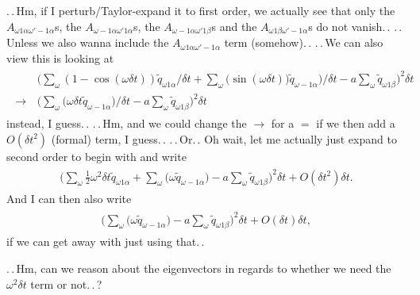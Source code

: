 \documentclass{report}
\begin{document}
.\,.\,Hm, if I perturb/Taylor-expand it to first order, we actually see that only the $A_{\omega 1\alpha\omega'-1\alpha}$s, the $A_{\omega- 1\alpha\omega' 1\alpha}$s, the $A_{\omega-1\alpha\omega' 1\beta}$s and the $A_{\omega 1\beta\omega'-1\alpha}$s do not vanish.\,. .\,.\,Unless we also wanna include the $A_{\omega 1\alpha\omega'-1\alpha}$ term (somehow).\,. .\,.\,We can also view this is looking at
\begin{align}
\begin{aligned}
	&\,\bigg( 
		\sum_{\omega} 
			(1 - \cos(\omega \delta t)) \tilde q_{\omega 1\alpha} 
			/ \delta t 
		+ 
		\sum_{\omega} \big(
			\sin(\omega \delta t)) \tilde q_{\omega-1\alpha}
		\big) / \delta t 
		- 
		a \sum_{\omega} 
			\tilde q_{\omega 1\beta}
	\bigg)^2 
	\delta t
	\\
	\to&\,\bigg(
		\sum_{\omega} \big(
			\omega \delta t \tilde q_{\omega-1\alpha}
		\big) / \delta t 
		- 
		a \sum_{\omega} 
			\tilde q_{\omega 1\beta}
	\bigg)^2 
	\delta t
\end{aligned}
\end{align}
instead, I guess.\,. .\,.\,Hm, and we could change the $\to$ for a $=$ if we then add a $O(\delta t^2)$ (formal) term, I guess.\,. .\,.\,Or.\,. Oh wait, let me actually just expand to second order to begin with and write
\begin{align}
\begin{aligned}
	\bigg(
		\sum_{\omega} 
			\frac{1}{2} \omega^2 \delta t \tilde q_{\omega 1\alpha} 
		+ 
		\sum_{\omega} \big(
			\omega  \tilde q_{\omega-1\alpha}
		\big)
		- 
		a \sum_{\omega} 
			\tilde q_{\omega 1\beta}
	\bigg)^2 
	\delta t
	+
	O(\delta t^2) \delta t.
\end{aligned}
\end{align}
And I can then also write 
\begin{align}
\begin{aligned}
	\bigg(
		\sum_{\omega} \big(
			\omega  \tilde q_{\omega-1\alpha}
		\big)
		- 
		a \sum_{\omega} 
			\tilde q_{\omega 1\beta}
	\bigg)^2 
	\delta t
	+
	O(\delta t) \delta t,
\end{aligned}
\end{align}
if we can get away with just using that.\,. %

.\,.\,Hm, can we reason about the eigenvectors in regards to whether we need the $\omega^2\delta t$ term or not.\,.\,? %
\end{document}
